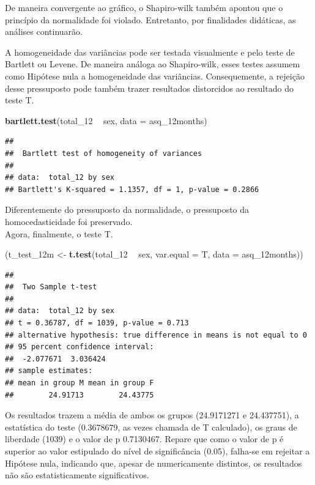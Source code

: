 \documentclass[
]{book}
\newenvironment{Shaded}{\begin{snugshade}}{\end{snugshade}}
\newcommand{\DataTypeTok}[1]{\textcolor[rgb]{0.13,0.29,0.53}{#1}}
\newcommand{\DecValTok}[1]{\textcolor[rgb]{0.00,0.00,0.81}{#1}}
\newcommand{\KeywordTok}[1]{\textcolor[rgb]{0.13,0.29,0.53}{\textbf{#1}}}
\newcommand{\NormalTok}[1]{#1}
\newcommand{\OperatorTok}[1]{\textcolor[rgb]{0.81,0.36,0.00}{\textbf{#1}}}
\newcommand{\StringTok}[1]{\textcolor[rgb]{0.31,0.60,0.02}{#1}}
\begin{document}
De maneira convergente ao gráfico, o Shapiro-wilk também apontou que o princípio da normalidade foi violado. Entretanto, por finalidades didáticas, as análises continuarão.

A homogeneidade das variâncias pode ser testada visualmente e pelo teste de Bartlett ou Levene. De maneira análoga ao Shapiro-wilk, esses testes assumem como Hipótese nula a homogeneidade das variâncias. Consequemente, a rejeição desse pressuposto pode também trazer resultados distorcidos ao resultado do teste T.

\begin{Shaded}
\begin{Highlighting}[]
\KeywordTok{bartlett.test}\NormalTok{(total_}\DecValTok{12} \OperatorTok{~}\StringTok{ }\NormalTok{sex, }\DataTypeTok{data =}\NormalTok{ asq_12months)}
\end{Highlighting}
\end{Shaded}

\begin{verbatim}
## 
##  Bartlett test of homogeneity of variances
## 
## data:  total_12 by sex
## Bartlett's K-squared = 1.1357, df = 1, p-value = 0.2866
\end{verbatim}

Diferentemente do pressuposto da normalidade, o pressuposto da homocedasticidade foi preservado.\\
Agora, finalmente, o teste T.

\begin{Shaded}
\begin{Highlighting}[]
\NormalTok{(t_test_12m <-}\StringTok{ }\KeywordTok{t.test}\NormalTok{(total_}\DecValTok{12} \OperatorTok{~}\StringTok{ }\NormalTok{sex, }\DataTypeTok{var.equal =}\NormalTok{ T, }\DataTypeTok{data =}\NormalTok{ asq_12months))}
\end{Highlighting}
\end{Shaded}

\begin{verbatim}
## 
##  Two Sample t-test
## 
## data:  total_12 by sex
## t = 0.36787, df = 1039, p-value = 0.713
## alternative hypothesis: true difference in means is not equal to 0
## 95 percent confidence interval:
##  -2.077671  3.036424
## sample estimates:
## mean in group M mean in group F 
##        24.91713        24.43775
\end{verbatim}

Os resultados trazem a média de ambos os grupos (24.9171271 e 24.437751), a estatística do teste (0.3678679, as vezes chamada de T calculado), os graus de liberdade
(1039) e o valor de p 0.7130467. Repare que como o valor de p é superior ao valor estipulado do nível de significância (0.05), falha-se em rejeitar a Hipótese nula, indicando que, apesar de numericamente distintos, os resultados não são estatisticamente significativos.
\end{document}
